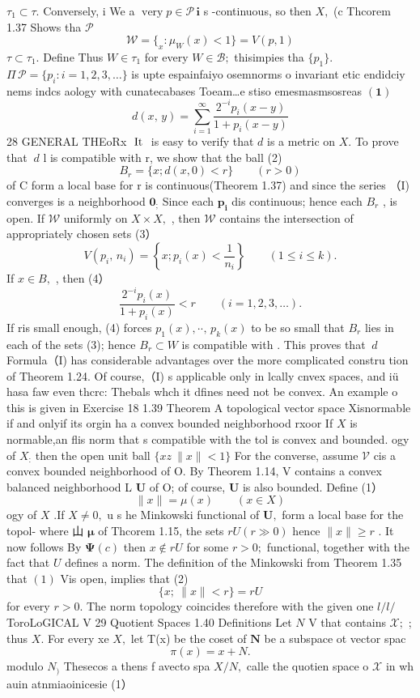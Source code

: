 $\tau_{1}\subset\tau.$ Conversely, i We a $\operatorname{very}p\in{\mathcal{P}}\,\mathbf{i}$ s -continuous, so then $X,$ (c Thcorem 1.37 Shows tha ${\mathcal{P}}$ $$ {\mathcal W}=\{_{x}\colon\mu_{W}(x)<1\}=V(p,1) $$ $\tau\subset\tau_{1}.$ Define Thus $W\in\tau_{1}$ for every $W\in{\mathcal{B}};$ thisimpies tha $\{p_{1}\}.$ $\Pi\,{\mathcal{P}}=\{p_{i}\colon i=1,2,3,\dots\}$ is upte espainfaiyo osemnorms o invariant etic endidciy nems indcs aology with cunatecabases Toeam…e stiso emesmasmsosreas $(\mathbf{1})$ $$ d(x,\,y)=\sum_{i=1}^{\infty}{\frac{2^{-i}p_{i}(x-y)}{1+p_{i}(x-y)}} $$28 GENERAL THEoRx $\mathrm{\boldmath~It~}$ is easy to verify that $d$ is a metric on $X.$ To prove that $\ d$ l is compatible with r, we show that the ball (2) $$ B_{r}=\{x;d(x,0)<r\}\qquad(r>0) $$ of C form a local base for r is continuous(Theorem 1.37) and since the series （I) converges is a neighborhood $\mathbf{0}_{;}$ Since each $\boldsymbol{p_{i}}$ dis continuous; hence each $B_{r}$ , is open. If $\mathcal{W}$ uniformly on $X\times X,$ , then ${\mathcal{W}}$ contains the intersection of appropriately chosen sets (3） $$ V(p_{i},\,n_{i})=\left\{x;p_{i}(x)<\frac{1}{n_{i}}\right\}\qquad(1\leq i\leq k). $$ If $x\in B,$ , then (4） $$ \frac{2^{-i}p_{i}(x)}{1+p_{i}(x)}<r\qquad(i=1,2,3,\dots). $$ If ris small enough, (4) forces $p_{1}(x),\cdot\cdot,\,p_{k}(x)$ to be so small that $B_{r}$ lies in each of the sets (3); hence $B_{r}\subset W$ is compatible with . This proves that $\ d{\mathrm{~}}$ Formula（I) has considerable advantages over the more complicated constru tion of Theorem 1.24. Of course,（I) s applicable only in lcally cnvex spaces, and iü hasa faw even thcrc: Thebals whch it dfines need not be convex. An example o this is given in Exercise 18 1.39 Theorem A topological vector space Xisnormable if and onlyif its orgin ha a convex bounded neighborhood rxoor If $X$ is normable,an flis norm that s compatible with the tol is convex and bounded. ogy of $\textstyle X_{\mathrm{:}}$ then the open unit ball $\{x z\ \|x\|<1\}$ For the converse, assume ${\mathcal{V}}$ cis a convex bounded neighborhood of O. By Theorem 1.14, V contains a convex balanced neighborhood L ${\boldsymbol{U}}$ of O; of course, ${\boldsymbol{U}}$ is also bounded. Define (1） $$ \|x\|=\mu(x)\qquad(x\in X) $$ ogy of $X$ .If $\textstyle X\neq0,$ u s he Minkowski functional of ${\boldsymbol{U}},$ form a local base for the topol- where 山 $\boldsymbol{\mu}$ of Thcorem 1.15, the sets $r U\left(r\gg0\right)$ hence $\|x\|\geq r$ . It now follows By $\mathbf{\Psi}(c)$ then $x\not\in r U$ for some $r>0;$ functional, together with the fact that $U$ defines a norm. The definition of the Minkowski from Theorem 1.35 that $\operatorname{\left(1\right)}$ Vis open, implies that (2) $$ \{x;\ \|x\|<r\}=r U $$ for every $r>0.$ The norm topology coincides therefore with the given one $l/l/$ToroLoGICAL V 29 Quotient Spaces 1.40 Definitions Let $\textstyle N$ V that contains ${\mathcal{X}};$ ; thus $X.$ For every xe $X,$ let T(x) be the coset of ${\boldsymbol{N}}$ be a subspace ot vector spac $$ \pi(x)=x+N. $$ modulo $N_{\!\mathrm{)}}$ Thesecos a thens f avecto spa $X/N,$ calle the quotien space o $\textstyle{\mathcal{X}}$ in wh auin atnmiaoinicesie (1） $$ 
